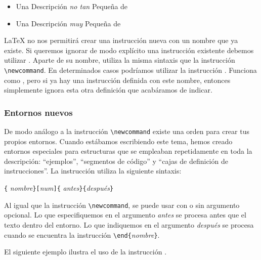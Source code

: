 \begin{example}
\newcommand{\txsit}[1]
    {Una Descripción \emph{#1}
     Pequeña de \LaTeXe}
\begin{itemize}
\item \txsit{no tan}
\item \txsit{muy}
\end{itemize}
\end{example}

\LaTeX{}  no  nos  permitirá  crear   una  instrucción  nueva  con  un
nombre  que ya  existe.  Si  queremos ignorar  de  modo explícito  una
instrucción  existente  debemos   utilizar  .  Aparte
de  su   nombre,  utiliza  la   misma  sintaxis  que   la  instrucción
\verb|\newcommand|.  En  determinados   casos  podríamos  utilizar  la
instrucción .  Funciona como  , pero
si ya hay una instrucción definida con este nombre, entonces \LaTeXe{}
simplemente ignora esta otra definición que acabáramos de indicar.

\subsubsection{Entornos nuevos}

De  modo  análogo  a  la  instrucción  \verb|\newcommand|  existe  una
orden para  crear tus  propios entornos. Cuando  estábamos escribiendo
este  tema,  hemos creado  entornos  especiales  para estructuras  que
se  empleaban  repetidamente  en toda  la  descripción:  ``ejemplos'',
``segmentos de código'' y ``cajas de definición de instrucciones''. La
instrucción  utiliza la siguiente sintaxis:

\begin{command}
\verb|{|%
       \emph{nombre}\verb|}[|\emph{num}\verb|]{|%
       \emph{antes}\verb|}{|\emph{después}\verb|}|
\end{command}

Al  igual  que  la   instrucción  \verb|\newcommand|,  se  puede  usar
   con   o   sin   argumento   opcional.   Lo   que
especifiquemos  en  el argumento  \emph{antes}  se  procesa antes  que
el  texto  dentro del  entorno.  Lo  que  indiquemos en  el  argumento
\emph{después}  se   procesa  cuando   se  encuentra   la  instrucción
\verb|\end{|\emph{nombre}\verb|}|.

El   siguiente   ejemplo   ilustra    el   uso   de   la   instrucción
.

